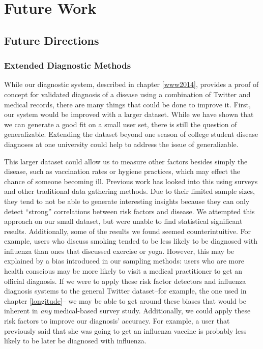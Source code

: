 \chapter{Future Work}
\section{Future Directions}
\subsection{Extended Diagnostic Methods}

While our diagnostic system, described in chapter \ref{www2014}, provides a proof of concept for validated diagnosis of a disease using a combination of Twitter and medical records, there are many things that could be done to improve it. First, our system would be improved with a larger dataset. While we have shown that we can generate a good fit on a small user set, there is still the question of generalizable. Extending the dataset beyond one season of college student disease diagnoses at one university could help to address the issue of generalizable. 

This larger dataset could allow us to measure other factors besides simply the disease, such as vaccination rates or hygiene practices, which may effect the chance of someone becoming ill.\cite{viboud2004risk} Previous work \cite{mounts1999case,dinh2006risk,o2010risk}   has looked into this using surveys and other traditional data gathering methods. Due to their limited sample sizes, they tend to not be able to generate interesting insights because they can only detect ``strong'' correlations between risk factors and disease. We attempted this approach on our small dataset, but were unable to find statistical significant results. Additionally, some of the results we found seemed counterintuitive. For example, users who discuss smoking tended to be less likely to be diagnosed with influenza than ones that discussed exercise or yoga. However, this may be explained by a bias introduced in our sampling methods: users who are more health conscious may be more likely to visit a medical practitioner to get an official diagnosis. If we were to apply these risk factor detectors and influenza diagnosis systems to the general Twitter dataset--for example, the one used in chapter \ref{longitude}-- we may be able to get around these biases that would be inherent in \emph{any} medical-based survey study. Additionally, we could apply these risk factors to improve our diagnosis' accuracy. For example, a user that previously said that she was going to get an influenza vaccine is probably less likely to be later be diagnosed with influenza. 

